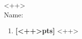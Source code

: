 \documentclass[12pt]{article}
\newcommand{\fen}[1]{\textbf{[#1pts]}}
\begin{document}
\begin{center}
  \large{\textsc{<++>}}\\
  Name: \underline{\hspace{1.5in}}
\end{center}

\begin{enumerate}
  \item\fen{<++>} <++> 
\end{enumerate}
\end{document}

